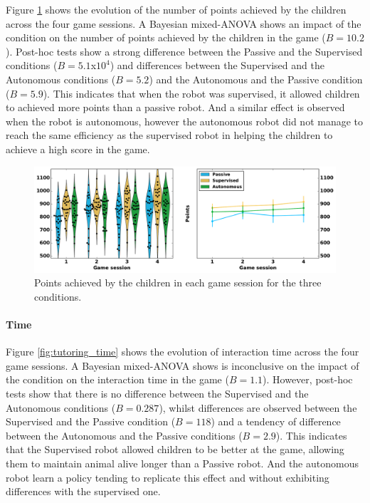 Figure \ref{fig:tutoring_points} shows the evolution of the number of points achieved by the children across the four game sessions. A Bayesian mixed-ANOVA shows an impact of the condition on the number of points achieved by the children in the game ($B=10.2$). Post-hoc tests show a strong difference between the Passive and the Supervised conditions ($B=5.1$x$10^4$) and differences between the Supervised and the Autonomous conditions ($B=5.2$) and the Autonomous and the Passive condition ($B=5.9$). This indicates that when the robot was supervised, it allowed children to achieved more points than a  passive robot. And a similar effect is observed when the robot is autonomous, however the autonomous robot did not manage to reach the same efficiency as the supervised robot in helping the children to achieve a high score in the game.

\begin{figure}[ht]
	\includegraphics[width=1\linewidth]{points.pdf}
	\centering
	\caption{Points achieved by the children in each game session for the three conditions.}
	\label{fig:tutoring_points}
\end{figure}

\paragraph{Time}

Figure \ref{fig:tutoring_time} shows the evolution of interaction time across the four game sessions. A Bayesian mixed-ANOVA shows is inconclusive on the impact of the condition on the interaction time in the game ($B=1.1$). However, post-hoc tests show that there is no difference between the Supervised and the Autonomous conditions ($B=0.287$), whilst differences are observed between the Supervised and the Passive condition ($B=118$) and a tendency of difference between the Autonomous and the Passive conditions ($B=2.9$). This indicates that the Supervised robot allowed children to be better at the game, allowing them to maintain animal alive longer than a Passive robot. And the autonomous robot learn a policy tending to replicate this effect and without exhibiting differences with the supervised one.


